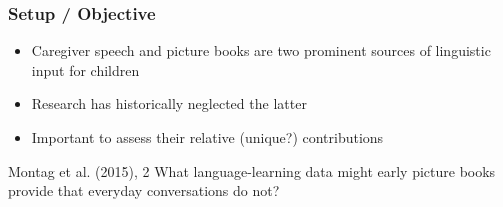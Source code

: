\documentclass{beamer}
\begin{document}

\begin{frame}
\frametitle{Setup / Objective}
\begin{itemize}
\item Caregiver speech and picture books are two prominent sources of linguistic input for children
\item Research has historically neglected the latter
\item Important to assess their relative (unique?) contributions


\end{itemize}
\begin{block}{Montag et al. (2015), 2}
What language-learning data might early picture books provide that everyday conversations do not?
\end{block}
\end{frame}
\end{document}
